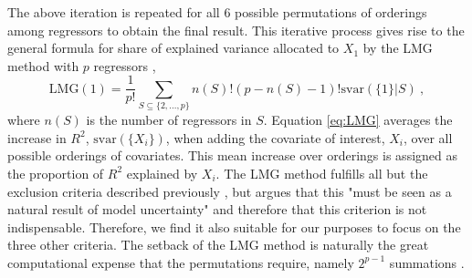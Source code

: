 The above iteration is repeated for all 6 possible permutations of orderings among regressors to obtain the final result.
This iterative process gives rise to the general formula for share of explained variance allocated to $X_1$ by the LMG method with $p$ regressors \citep{gromping_relaimpo},
\begin{equation}
    \label{eq:LMG}
    \text{LMG}(1) = \frac{1}{p!} \sum_{S \subseteq \{2, ..., p\}} n(S)! (p - n(S)-1)! \text{svar}(\{1\} \lvert S) \ ,
\end{equation} 
where $n(S)$ is the number of regressors in $S$.
Equation \eqref{eq:LMG} averages the increase in $R^2$, $\text{svar}(\{X_i\})$, when adding the covariate of interest, $X_i$, over all possible orderings of covariates. 
This mean increase over orderings is assigned as the proportion of $R^2$ explained by $X_i$.
The LMG method fulfills all but the exclusion criteria described previously \citep{gromping_relaimpo}, but \citet{gromping_relaimpo} argues that this "must be seen as a natural result of model uncertainty" and therefore that this criterion is not indispensable.
Therefore, we find it also suitable for our purposes to focus on the three other criteria.
The setback of the LMG method is naturally the great computational expense that the permutations require, namely $2^{p-1}$ summations \citep{gromping_relaimpo}. 

